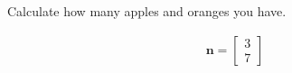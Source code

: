 Calculate how many apples and oranges you have.

\begin{solution}
    \begin{align*}
        \boldsymbol{n} = \begin{bmatrix}
            3 \\ 7
        \end{bmatrix}
    \end{align*}
\end{solution}